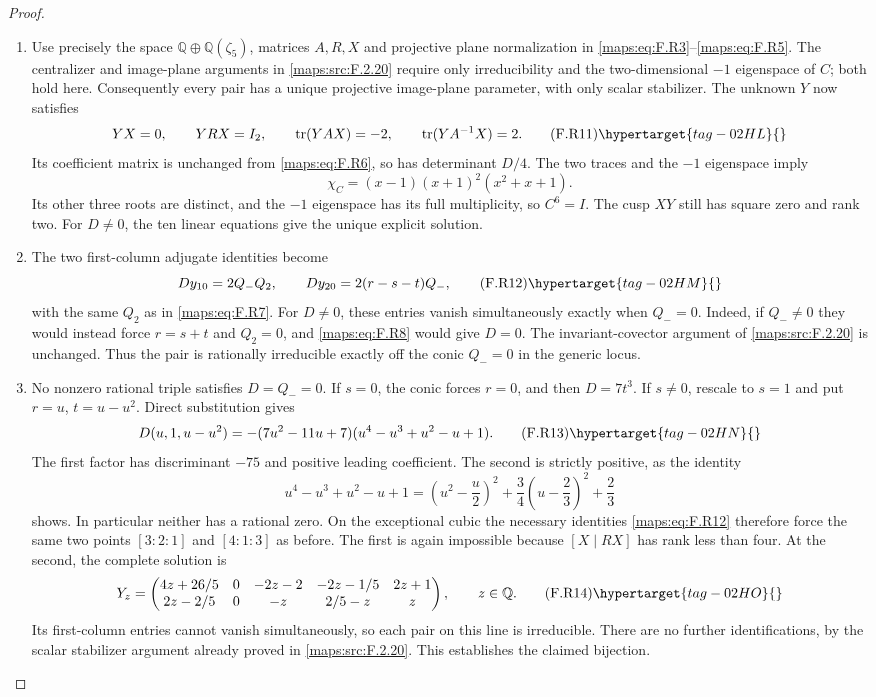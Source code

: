 \begin{proof}
\begin{enumerate}[label={$\langle1\rangle$\arabic*.}]
\item Use precisely the space $\mathbb Q\oplus\mathbb Q(\zeta_5)$,
matrices $A,R,X$ and projective plane normalization in
\eqref{maps:eq:F.R3}--\eqref{maps:eq:F.R5}.  The centralizer and image-plane arguments
in \ref{maps:src:F.2.20} require only irreducibility and the two-dimensional
$-1$ eigenspace of $C$; both hold here.
Consequently every pair has a unique projective image-plane
parameter, with only scalar stabilizer.
The unknown $Y$ now satisfies
\[
 YX=0,\qquad YRX=I_2,\qquad
 \operatorname{tr}(YAX)=-2,\qquad
 \operatorname{tr}(YA^{-1}X)=2.
 \tag{F.R11}\hypertarget{tag-02HL}{}\label{maps:eq:F.R11}
\]
Its coefficient matrix is unchanged from \eqref{maps:eq:F.R6}, so has
determinant $D/4$.
The two traces and the $-1$ eigenspace imply
\[
 \chi_C=(x-1)(x+1)^2(x^2+x+1).
\]
Its other three roots are distinct, and the $-1$ eigenspace
has its full multiplicity, so $C^6=I$.
The cusp $XY$ still has square zero and rank two.
For $D\ne0$, the ten linear equations give the unique
explicit solution.

\item The two first-column adjugate identities become
\[
 D y_{10}=2Q_-Q_2,
 \qquad D y_{20}=2(r-s-t)Q_-,
 \tag{F.R12}\hypertarget{tag-02HM}{}\label{maps:eq:F.R12}
\]
with the same $Q_2$ as in \eqref{maps:eq:F.R7}.
For $D\ne0$, these entries vanish simultaneously exactly
when $Q_-=0$.
Indeed, if $Q_-\ne0$ they would instead force
$r=s+t$ and $Q_2=0$, and \eqref{maps:eq:F.R8} would give $D=0$.
The invariant-covector argument of \ref{maps:src:F.2.20} is unchanged.
Thus the pair is rationally irreducible exactly off the
conic $Q_-=0$ in the generic locus.

\item No nonzero rational triple satisfies $D=Q_-=0$.
If $s=0$, the conic forces $r=0$, and then $D=7t^3$.
If $s\ne0$, rescale to $s=1$ and put
$r=u$, $t=u-u^2$.  Direct substitution gives
\[
 D(u,1,u-u^2)=
 -(7u^2-11u+7)(u^4-u^3+u^2-u+1).
 \tag{F.R13}\hypertarget{tag-02HN}{}\label{maps:eq:F.R13}
\]
The first factor has discriminant $-75$ and positive
leading coefficient.  The second is strictly positive,
as the identity
\[
 u^4-u^3+u^2-u+1
 =\left(u^2-\frac u2\right)^2
  +\frac34\left(u-\frac23\right)^2+\frac23
\]
shows.  In particular neither has a rational zero.
On the exceptional cubic the necessary identities \eqref{maps:eq:F.R12}
therefore force the same two points $[3:2:1]$ and $[4:1:3]$
as before.  The first is again impossible because
$[X\mid RX]$ has rank less than four.
At the second, the complete solution is
\[
 Y_z=\begin{pmatrix}
 4z+26/5&0&-2z-2&-2z-1/5&2z+1\\
 2z-2/5&0&-z&2/5-z&z
 \end{pmatrix},\qquad z\in\mathbb Q.
 \tag{F.R14}\hypertarget{tag-02HO}{}\label{maps:eq:F.R14}
\]
Its first-column entries cannot vanish simultaneously,
so each pair on this line is irreducible.
There are no further identifications, by the scalar
stabilizer argument already proved in \ref{maps:src:F.2.20}.
This establishes the claimed bijection.


\end{enumerate}
\end{proof}
